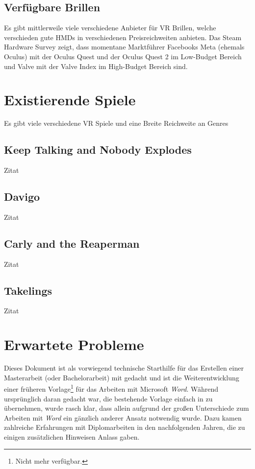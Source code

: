 \subsection{Verfügbare Brillen}
Es gibt mittlerweile viele verschiedene Anbieter für VR Brillen, welche verschieden gute HMDs in verschiedenen Preisreichweiten anbieten.
Das Steam Hardware Survey zeigt, dass momentane Marktführer Facebooks Meta (ehemals Oculus) mit der Oculus Quest und der Oculus Quest 2 im Low-Budget Bereich und Valve mit der Valve Index im High-Budget Bereich sind.


\section{Existierende Spiele}
Es gibt viele verschiedene VR Spiele und eine Breite Reichweite an Genres

\subsection{Keep Talking and Nobody Explodes}
Zitat \cite{bobsch 123 bobsch}

\subsection{Davigo}
Zitat \cite{bobsch 123 bobsch}

\subsection{Carly and the Reaperman}
Zitat \cite{bobsch 123 bobsch}

\subsection{Takelings}
Zitat \cite{bobsch 123 bobsch}

\section{Erwartete Probleme}
Dieses Dokument ist als vorwiegend technische Starthilfe für das
Erstellen einer Masterarbeit (oder Bachelorarbeit) mit \latex
gedacht und ist die Weiterentwicklung einer früheren
Vorlage\footnote{Nicht mehr verfügbar.} für das Arbeiten mit
Microsoft \emph{Word}. Während ursprünglich daran gedacht war, die
bestehende Vorlage einfach in \latex zu übernehmen, wurde rasch
klar, dass allein aufgrund der großen Unterschiede zum Arbeiten
mit \emph{Word} ein gänzlich anderer Ansatz notwendig wurde. Dazu
kamen zahlreiche Erfahrungen mit Diplomarbeiten in den
nachfolgenden Jahren, die zu einigen zusätzlichen Hinweisen Anlass gaben.

